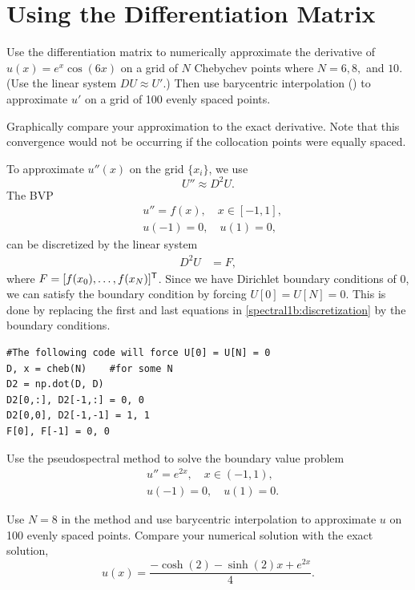 \section*{Using the Differentiation Matrix}


\begin{problem}
Use the differentiation matrix to numerically approximate the derivative of $u(x) = e^{x}\cos(6x)$ on a grid of $N$ Chebychev points where $N=6, 8,$ and $10.$
(Use the linear system $D U \approx U'$.)
Then use barycentric interpolation () to approximate $u'$ on a grid of 100 evenly spaced points.

Graphically compare your approximation to the exact derivative.
Note that this convergence would not be occurring if the collocation points were equally spaced.
\end{problem}

To approximate $u''(x)$ on the grid $\{x_i\}$, we use
\[U'' \approx D^2 U.\]
The BVP
\begin{align*}
&{ }u'' = f(x), \quad x \in [-1,1],\\
&{ }u(-1) = 0, \quad u(1) = 0,
\end{align*}
can be discretized by the linear system
\begin{align}
	D^2 U &= F, \label{spectral1b:discretization}
\end{align}
where $F = [f(x_0),\ldots, f(x_N)]^{\mathsf T} $.
Since we have Dirichlet boundary conditions of $0$, we can satisfy the boundary condition by forcing $U[0] = U[N] = 0$.
This is done by replacing the first and last equations in \eqref{spectral1b:discretization} by the boundary conditions.

\begin{lstlisting}
#The following code will force U[0] = U[N] = 0
D, x = cheb(N)    #for some N
D2 = np.dot(D, D)
D2[0,:], D2[-1,:] = 0, 0
D2[0,0], D2[-1,-1] = 1, 1
F[0], F[-1] = 0, 0
\end{lstlisting}


\begin{problem}
Use the pseudospectral method to solve the boundary value problem
\begin{align*}
&{ } u'' = e^{2x}, \quad x \in (-1,1), \\
&{ } u(-1) = 0, \quad u(1) = 0.
\end{align*}

Use $N=8$ in the  method and use barycentric interpolation to approximate $u$ on 100 evenly spaced points.
Compare your numerical solution with the exact solution,
\[
u(x) = \frac{- \cosh(2) - \sinh(2)x + e^{2x}}{4}.
\]
\end{problem}


